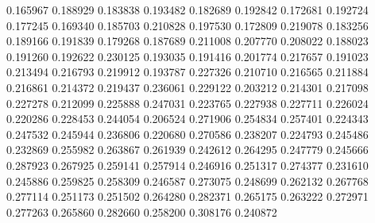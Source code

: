 0.165967
0.188929
0.183838
0.193482
0.182689
0.192842
0.172681
0.192724
0.177245
0.169340
0.185703
0.210828
0.197530
0.172809
0.219078
0.183256
0.189166
0.191839
0.179268
0.187689
0.211008
0.207770
0.208022
0.188023
0.191260
0.192622
0.230125
0.193035
0.191416
0.201774
0.217657
0.191023
0.213494
0.216793
0.219912
0.193787
0.227326
0.210710
0.216565
0.211884
0.216861
0.214372
0.219437
0.236061
0.229122
0.203212
0.214301
0.217098
0.227278
0.212099
0.225888
0.247031
0.223765
0.227938
0.227711
0.226024
0.220286
0.228453
0.244054
0.206524
0.271906
0.254834
0.257401
0.224343
0.247532
0.245944
0.236806
0.220680
0.270586
0.238207
0.224793
0.245486
0.232869
0.255982
0.263867
0.261939
0.242612
0.264295
0.247779
0.245666
0.287923
0.267925
0.259141
0.257914
0.246916
0.251317
0.274377
0.231610
0.245886
0.259825
0.258309
0.246587
0.273075
0.248699
0.262132
0.267768
0.277114
0.251173
0.251502
0.264280
0.282371
0.265175
0.263222
0.272971
0.277263
0.265860
0.282660
0.258200
0.308176
0.240872
